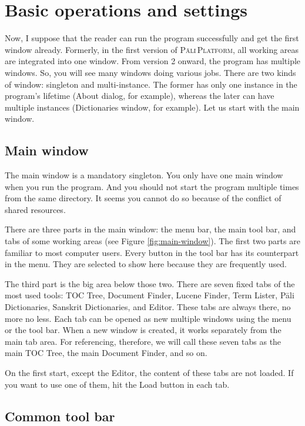 \chapter{Basic operations and settings}\label{chap:basic}

Now, I suppose that the reader can run the program successfully and get the first window already. Formerly, in the first version of \textsc{Pāli\,Platform}, all working areas are integrated into one window. From version 2 onward, the program has multiple windows. So, you will see many windows doing various jobs. There are two kinds of window: singleton and multi-instance. The former has only one instance in the program's lifetime (About dialog, for example), whereas the later can have multiple instances (Dictionaries window, for example). Let us start with the main window.

\section{Main window}

The main window is a mandatory singleton. You only have one main window when you run the program. And you should not start the program multiple times from the same directory. It seems you cannot do so because of the conflict of shared resources.

There are three parts in the main window: the menu bar, the main tool bar, and tabs of some working areas (see Figure \ref{fig:main-window}). The first two parts are familiar to most computer users. Every button in the tool bar has its counterpart in the menu. They are selected to show here because they are frequently used.

The third part is the big area below those two. There are seven fixed tabs of the most used tools: TOC Tree, Document Finder, Lucene Finder, Term Lister, Pāli Dictionaries, Sanskrit Dictionaries, and Editor. These tabs are always there, no more no less. Each tab can be opened as new multiple windows using the menu or the tool bar. When a new window is created, it works separately from the main tab area. For referencing, therefore, we will call these seven tabs as the main TOC Tree, the main Document Finder, and so on.

On the first start, except the Editor, the content of these tabs are not loaded. If you want to use one of them, hit the Load button in each tab.

\section{Common tool bar}

